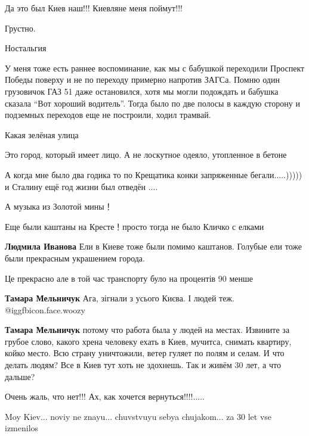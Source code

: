 \begin{itemize}
Да это был Киев наш!!! Киевляне меня поймут!!!

Грустно.

Ностальгия


У меня тоже есть раннее воспоминание, как мы с бабушкой переходили Проспект
Победы поверху и не по переходу примерно напротив ЗАГСа. Помню один грузовичок
ГАЗ 51 даже остановился, хотя мы могли подождать и бабушка сказала \enquote{Вот хороший
водитель}. Тогда было по две полосы в каждую сторону и подземных переходов еще
не построили, ходил трамвай.


Какая зелёная улица

Это город, который имеет лицо. А не лоскутное одеяло, утопленное в бетоне

А когда мне было два годика то по Крещатика конки запряженные бегали.....)))))
и Сталину ещё год жизни был отведён ....

А музыка из Золотой мины！

Еще были каштаны на Кресте！просто тогда не было Кличко с елками

\begin{itemize} %
\textbf{Людмила Иванова} Ели в Киеве тоже были помимо каштанов. Голубые ели тоже были прекрасным украшением города.
\end{itemize} %

Це прекрасно але в той час транспорту було на процентів 90 менше

\begin{itemize} %
\textbf{Тамара Мельничук} Ага, зігнали з усього Києва. І людей теж.  @igg{fbicon.face.woozy} 

\textbf{Тамара Мельничук} потому что работа была у людей на местах. Извините за грубое слово, какого хрена человеку ехать в Киев, мучитса, снимать квартиру, койко место. Всю страну уничтожили, ветер гуляет по полям и селам. И что делать людям? Все в Киев тут хоть не здохнешь. Так и живём 30 лет, а что дальше?
\end{itemize} %

Очень жаль, что нет!!! Ах, как хочется вернуться!!!!.....

Moy Kiev... noviy ne znayu... chuvstvuyu sebya chujakom... za 30 let vse izmenilos


\end{itemize}
